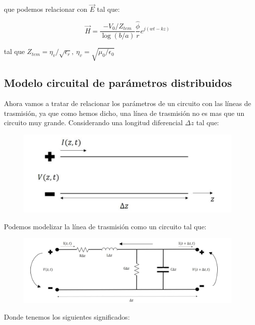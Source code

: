 \documentclass[12pt,a4paper]{article}
\begin{document}
que podemos relacionar con $\vec{E}$ tal que:

\begin{equation}
\vec{H} = \dfrac{-V_0 / Z_{tem}}{\log ( b/a)} \dfrac{\hat{\phi}}{r} e^{j(wt-kz)}
\end{equation}

tal que $Z_{tem} = \eta_v / \sqrt{\epsilon_r}, \ \eta_v = \sqrt{\mu_0 / \epsilon_0}$



\subsection{Modelo circuital de parámetros distribuidos}

Ahora vamos a tratar de relacionar los parámetros de un circuito con las líneas de trasmisión, ya que como hemos dicho, una línea de trasmisión no es mas que un circuito muy grande. Considerando una longitud diferencial $\Delta z$ tal que:

\begin{figure}[h!] \centering
\includegraphics[scale=0.5]{lineatrasmision2.png}
\end{figure}


Podemos modelizar la línea de trasmisión como un circuito tal que:


\begin{figure}[h!] \centering
\includegraphics[scale=0.5]{lineatrasmision.png}
\end{figure}



Donde tenemos los siguientes significados:
\end{document}
